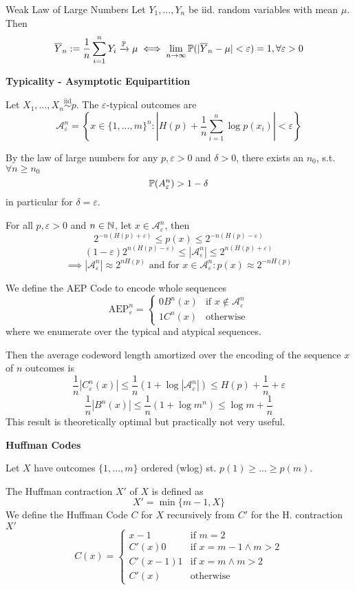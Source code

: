 \begin{mainbox}
    {Weak Law of Large Numbers}
    Let \(Y_1, ..., Y_n\) be iid. random variables with mean \(\mu\). Then 
    \[\overline{Y}_n := \frac{1}{n}\sum_{i = 1}^n Y_i \xrightarrow[]{\P} \mu \iff \lim_{n \to \infty}\P(|\overline{Y}_n - \mu| < \varepsilon) = 1, \forall \varepsilon > 0\]
\end{mainbox}

\textbf{Typicality - Asymptotic Equipartition}

Let \(X_1, ..., X_n \overset{\text{iid}}{\sim} p\). The \(\varepsilon\)-typical outcomes are 
\[\mathcal{A}_\varepsilon^n = \left\{x \in \{1, ..., m\}^n:\left|H(p)+ \frac{1}{n}\sum_{i = 1}^n \log p(x_i)\right| < \varepsilon\right\}\]

By the law of large numbers for any \(p, \varepsilon > 0\) and \(\delta > 0\), there exists an \(n_0\), s.t. \(\forall n \geq n_0\)
\[\P(A_\varepsilon^n)>1- \delta\]
in particular for \(\delta = \varepsilon\).

For all \(p, \varepsilon>0\) and \(n \in \N\), let \(x \in \mathcal{A}_\varepsilon^n\), then
\[2^{-n(H(p)+\varepsilon)} \leq p(x) \leq 2^{-n(H(p)-\varepsilon)}\]
\[(1-\varepsilon)2^{n(H(p)-\varepsilon)}\leq|\mathcal{A}_\varepsilon^n| \leq 2^{n(H(p)+\varepsilon)}\]
\[\implies |\mathcal{A}_\varepsilon^n| \approx 2^{nH(p)} \text{ and for }x \in \mathcal{A}_\varepsilon^n: p(x) \approx 2^{-nH(p)} \]

We define the AEP Code to encode whole sequences
\[\text{AEP}_\varepsilon^n = \begin{cases}
    0 B^n(x) &\text{if }x \notin \mathcal{A}_\varepsilon^n\\
    1 C^n(x) &\text{otherwise}
\end{cases}\]
where we enumerate over the typical and atypical sequences.

Then the average codeword length amortized over the encoding of the sequence \(x\) of \(n\) outcomes is
\[\frac{1}{n}|C_\varepsilon^n(x)| \leq \frac{1}{n}(1+\log|\mathcal{A}_\varepsilon^n|) \leq H(p)+ \frac{1}{n} + \varepsilon\]
\[\frac{1}{n}|B^n(x)| \leq \frac{1}{n}(1 + \log m^n) \leq \log m + \frac{1}{n}\]
This result is theoretically optimal but practically not very useful.

\textbf{Huffman Codes}

Let \(X\) have outcomes \(\{1, ..., m\}\) ordered (wlog) st. \(p(1) \geq ... \geq p(m)\). 

The Huffman contraction \(X'\) of \(X\) is defined as 
\[X' = \min\{m-1, X\}\]
We define the Huffman Code \(C\) for \(X\) recursively from \(C'\) for the H. contraction \(X'\)
\[C(x) = \begin{cases}
    x-1 &\text{if }m = 2\\
    C'(x)0 &\text{if }x = m-1 \land m > 2\\
    C'(x-1)1 &\text{if } x = m \land m > 2\\
    C'(x) &\text{otherwise} 
\end{cases}\]

